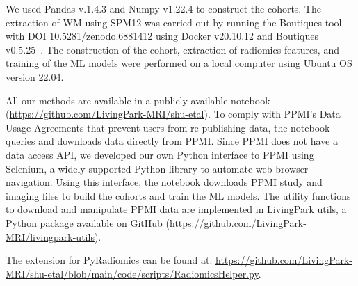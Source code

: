 We used Pandas v.1.4.3 and Numpy v1.22.4 to construct the cohorts. The extraction of WM using SPM12 was carried out by running the Boutiques tool with DOI 10.5281/zenodo.6881412 using Docker v20.10.12 and Boutiques v0.5.25~\cite{tristan_glatard_2022_6881412}. The construction of the cohort, extraction of radiomics features, and training of the ML models were performed on a local computer using Ubuntu OS version 22.04. 

All our methods are available in a publicly available notebook (\url{https://github.com/LivingPark-MRI/shu-etal}). To comply with PPMI's Data Usage Agreements that prevent users from re-publishing data, the notebook queries and downloads data directly from PPMI. Since PPMI does not have a data access API, we developed our own Python interface to PPMI using Selenium, a widely-supported Python library to automate web browser navigation. Using this interface, the notebook downloads PPMI study and imaging files to build the cohorts and train the ML models. The utility functions to download and manipulate PPMI data are implemented in LivingPark utils, a Python package available on GitHub (\url{https://github.com/LivingPark-MRI/livingpark-utils}).

The extension for PyRadiomics can be found at: \url{https://github.com/LivingPark-MRI/shu-etal/blob/main/code/scripts/RadiomicsHelper.py}.